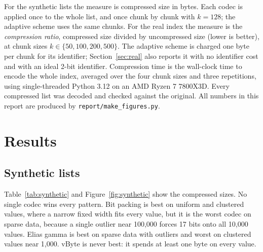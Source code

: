 \documentclass[11pt]{article}
\begin{document}
For the synthetic lists the measure is compressed size in bytes. Each codec is applied once to the
whole list, and once chunk by chunk with $k = 128$; the adaptive scheme uses the same chunks. For
the real index the measure is the \emph{compression ratio}, compressed size divided by
uncompressed size (lower is better), at chunk sizes $k \in \{50, 100, 200, 500\}$. The adaptive
scheme is charged one byte per chunk for its identifier; Section~\ref{sec:real} also reports it with
no identifier cost and with an ideal 2-bit identifier. Compression time is the wall-clock time to
encode the whole index, averaged over the four chunk sizes and three repetitions, using single-threaded
Python 3.12 on an AMD Ryzen 7 7800X3D. Every compressed list was decoded and checked against the
original. All numbers in this report are produced by \texttt{report/make\_figures.py}.

\section{Results}

\subsection{Synthetic lists}

Table~\ref{tab:synthetic} and Figure~\ref{fig:synthetic} show the compressed sizes. No single codec
wins every pattern. Bit packing is best on uniform and clustered values, where a narrow fixed width
fits every value, but it is the worst codec on sparse data, because a single outlier near 100{,}000
forces 17 bits onto all 10{,}000 values. Elias gamma is best on sparse data with outliers and worst
on clustered values near 1{,}000. vByte is never best: it spends at least one byte on every value.
\end{document}
